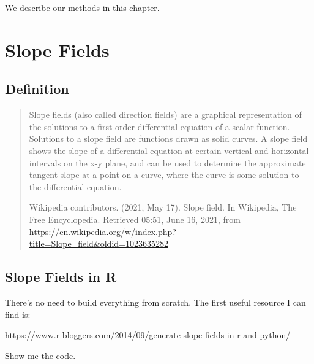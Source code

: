 \documentclass[
]{book}
\begin{document}
We describe our methods in this chapter.

\hypertarget{slope-fields}{%
\chapter{Slope Fields}\label{slope-fields}}

\hypertarget{definition}{%
\section{Definition}\label{definition}}

\begin{quote}
Slope fields (also called direction fields) are a graphical representation of the solutions to a first-order differential equation of a scalar function. Solutions to a slope field are functions drawn as solid curves. A slope field shows the slope of a differential equation at certain vertical and horizontal intervals on the x-y plane, and can be used to determine the approximate tangent slope at a point on a curve, where the curve is some solution to the differential equation.

\hfill Wikipedia contributors. (2021, May 17). Slope field. In Wikipedia, The Free Encyclopedia. Retrieved 05:51, June 16, 2021, from \url{https://en.wikipedia.org/w/index.php?title=Slope_field\&oldid=1023635282}
\end{quote}

\hypertarget{slope-fields-in-r}{%
\section{Slope Fields in R}\label{slope-fields-in-r}}

There's no need to build everything from scratch. The first useful resource I can find is:

\url{https://www.r-bloggers.com/2014/09/generate-slope-fields-in-r-and-python/}

Show me the code.
\end{document}

